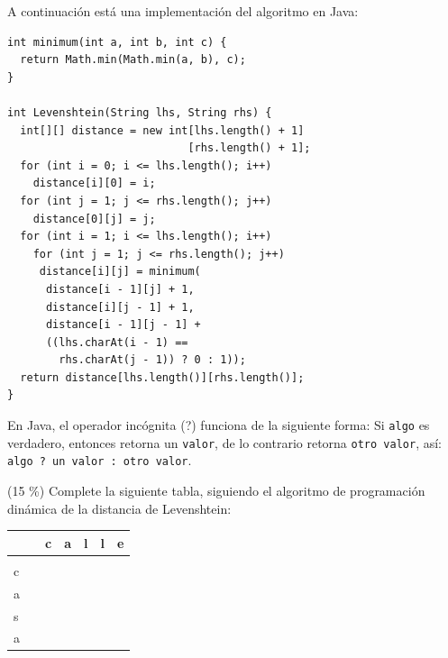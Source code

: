 \documentclass[twocolumn]{article}
\begin{document}
A continuación está una implementación del algoritmo en Java:

{\small
\begin{verbatim}
int minimum(int a, int b, int c) {                            
  return Math.min(Math.min(a, b), c);                                      
}                                                                            
                                                                                
int Levenshtein(String lhs, String rhs) {      
  int[][] distance = new int[lhs.length() + 1]
                            [rhs.length() + 1];                                   
  for (int i = 0; i <= lhs.length(); i++)                                 
    distance[i][0] = i;                                                  
  for (int j = 1; j <= rhs.length(); j++)                                 
    distance[0][j] = j;                                                                     
  for (int i = 1; i <= lhs.length(); i++)                                 
    for (int j = 1; j <= rhs.length(); j++)                             
     distance[i][j] = minimum(                                        
      distance[i - 1][j] + 1,                                  
      distance[i][j - 1] + 1,                                  
      distance[i - 1][j - 1] + 
      ((lhs.charAt(i - 1) == 
        rhs.charAt(j - 1)) ? 0 : 1));                                                           
  return distance[lhs.length()][rhs.length()];                          
}                                                                            
\end{verbatim}
}


En Java, el operador incógnita (?) funciona de la siguiente forma: Si \texttt{algo} es verdadero, entonces retorna un \texttt{valor},
de lo contrario retorna \texttt{otro valor}, así:
\texttt{algo ? un valor : otro valor}.


(15 \%) Complete la siguiente tabla, siguiendo el algoritmo de programación dinámica de la distancia de Levenshtein:\\

\begin{tabular}{| l  | l  | l  | l  | l  | l  | l |}
\hline
  & & c & a & l & l & e \\
 \hline
  & &  &  &  &  &  \\
  \hline
c & &  &  &  &  &  \\
\hline
a & &  &  &  &  &  \\
\hline
s & &  &  &  &  &  \\
\hline
a & &  &  &  &  &  \\
\hline
\end{tabular}
\end{document}
